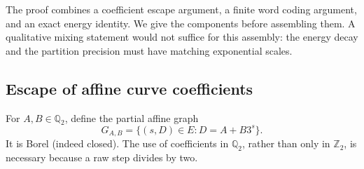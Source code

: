 \documentclass[11pt]{amsart}
\theoremstyle{definition}
\theoremstyle{remark}
\newcommand{\Ztwo}{\mathbb Z_2}
\newcommand{\Qtwo}{\mathbb Q_2}
\begin{document}
The proof combines a coefficient escape argument, a finite word coding
argument, and an exact energy identity.  We give the components before
assembling them.  A qualitative mixing statement would not suffice for
this assembly: the energy decay and the partition precision must have
matching exponential scales.

\subsection{Escape of affine curve coefficients}
\label{st:affine-subsection}

For $A,B\in\Qtwo$, define the partial affine graph
\[
 G_{A,B}=\{(s,D)\in E:D=A+B3^s\}.
\]
It is Borel (indeed closed).  The use of coefficients in $\Qtwo$, rather
than only in $\Ztwo$, is necessary because a raw step divides by two.
\end{document}
